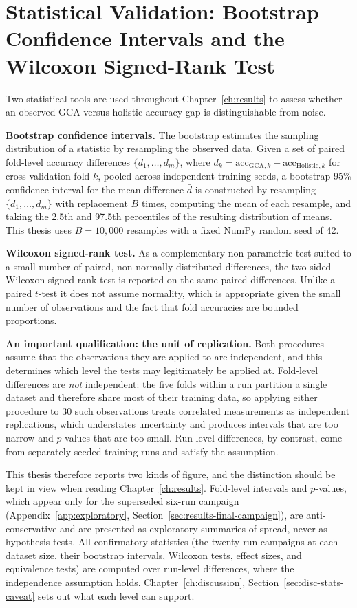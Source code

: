 \section{Statistical Validation: Bootstrap Confidence Intervals and the Wilcoxon Signed-Rank Test}
\label{sec:bg-stats}

Two statistical tools are used throughout Chapter~\ref{ch:results} to assess
whether an observed GCA-versus-holistic accuracy gap is distinguishable from
noise.

\textbf{Bootstrap confidence intervals.} The bootstrap \citep{efron1979bootstrap}
estimates the sampling distribution of a statistic by resampling the observed data.
Given a set of paired fold-level accuracy
differences $\{d_1, \ldots, d_m\}$, where $d_k = \mathrm{acc}_{\text{GCA}, k} -
\mathrm{acc}_{\text{Holistic}, k}$ for cross-validation fold $k$, pooled across
independent training seeds, a bootstrap 95\% confidence interval for the mean
difference $\bar{d}$ is constructed by resampling $\{d_1, \ldots, d_m\}$ with
replacement $B$ times, computing the mean of each resample, and taking the 2.5th
and 97.5th percentiles of the resulting distribution of means. This thesis uses $B
= 10{,}000$ resamples with a fixed NumPy random seed of 42.

\textbf{Wilcoxon signed-rank test.} As a complementary non-parametric test suited
to a small number of paired, non-normally-distributed differences, the two-sided
Wilcoxon signed-rank test \citep{wilcoxon1945individual} is reported on the same paired differences. Unlike a
paired $t$-test it does not assume normality, which is appropriate given the small
number of observations and the fact that fold accuracies are bounded proportions.

\textbf{An important qualification: the unit of replication.} Both procedures
assume that the observations they are applied to are independent, and this
determines which level the tests may legitimately be applied at. Fold-level
differences are \emph{not} independent: the five folds within a run partition a
single dataset and therefore share most of their training data, so applying
either procedure to 30 such observations treats correlated measurements as
independent replications, which understates uncertainty and produces intervals
that are too narrow and $p$-values that are too small. Run-level differences,
by contrast, come from separately seeded training runs and satisfy the
assumption.

This thesis therefore reports two kinds of figure, and the distinction should be
kept in view when reading Chapter~\ref{ch:results}. Fold-level intervals and
$p$-values, which appear only for the superseded six-run campaign
(Appendix~\ref{app:exploratory}, Section~\ref{sec:results-final-campaign}), are
anti-conservative and are presented as exploratory summaries of spread, never as
hypothesis tests. All confirmatory statistics (the twenty-run campaigns at each
dataset size, their bootstrap intervals, Wilcoxon tests, effect sizes, and
equivalence tests) are computed over run-level differences, where the
independence assumption holds. Chapter~\ref{ch:discussion},
Section~\ref{sec:disc-stats-caveat} sets out what each level can support.

